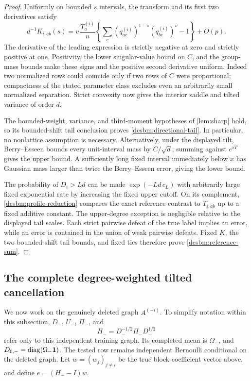 \begin{proof}
Uniformly on bounded \(s\) intervals, the transform and its first
two derivatives satisfy
\[
 d^{-1}K_{i,ab}(s)
 =v\,\frac{T_a^{(i)}}n
    \left\{\sum_c(q_{ac}^{(i)})^{1-s}(q_{bc}^{(i)})^s-1\right\}
       +O(p).
\]
The derivative of the leading expression is strictly negative
at zero and strictly positive at one.  Positivity, the lower
singular-value bound on \(C\), and the group-mass bounds make
these signs and the positive second derivative uniform.
Indeed two normalized rows could coincide only if two rows of
\(C\) were proportional; compactness of the stated parameter
class excludes even an arbitrarily small normalized separation.
Strict convexity now gives the interior saddle and tilted
variance of order \(d\).

The bounded-weight, variance, and third-moment hypotheses of
\cref{lem:sharp} hold, so its bounded-shift tail conclusion proves
\cref{dcsbm:directional-tail}.  In particular, no nonlattice
assumption is necessary.  Alternatively, under the displayed
tilt, Berry--Esseen bounds every unit-interval mass by \(C/\sqrt d\);
summing against \(e^{sT}\) gives the upper bound.  A sufficiently
long fixed interval immediately below \(x\) has Gaussian mass
larger than twice the Berry--Esseen error, giving the lower bound.

The probability of \(D_i>Ld\) can be made
\(\exp(-Ld\,c_L)\) with arbitrarily large fixed exponential rate
by increasing the fixed upper cutoff.  On its complement,
\cref{dcsbm:profile-reduction} compares the exact reference
contrast to \(T_{i,ab}\) up to a fixed additive constant.
The upper-degree exception is negligible relative to the displayed
tail scales.  Each strict pairwise defeat of the true label implies
an error, while an error is contained in the union of weak pairwise
defeats.  Fixed \(K\), the two bounded-shift tail bounds, and fixed
ties therefore prove \cref{dcsbm:reference-sum}.
\end{proof}

\subsection{The complete degree-weighted tilted cancellation}

We now work on the genuinely deleted graph \(A^{(-i)}\).
To simplify notation within this subsection, \(D_-\), \(U_-\),
\(\Pi_-\), and
\[
 H_-=D_-^{-1/2}\Pi_-D_-^{1/2}
\]
refer only to this independent training graph.  Its completed mean
is \(\Omega_-\), and \(D_{0,-}=\operatorname{diag}(\Omega_-\mathbf 1)\).
The tested row remains independent Bernoulli conditional on the
deleted graph.  Let \(w=(w_j)_{j\ne i}\) be the true block coefficient
vector above, and define \(e=(H_--I)w\).

